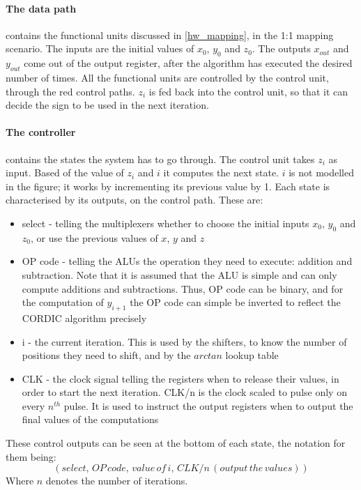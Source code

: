 \documentclass[12pt, a4paper,oneside]{article}
\begin{document}
\paragraph{The data path}
contains the functional units discussed in \ref{hw_mapping}, in the 1:1 mapping
scenario. The inputs are the initial values of $x_0$, $y_0$ and $z_0$. The outputs
$x_{out}$ and $y_{out}$
come out of the output register, after the algorithm has executed the desired
number of times. All the functional units are controlled by the control unit, 
through the red control paths. $z_i$ is fed back into the control unit, 
so that it can decide the sign to be used in the next iteration.

\paragraph{The controller}
contains the states the system has to go through. The control unit takes
$z_i$ as input. Based of the value of $z_i$ and $i$ it computes the next state.
$i$ is not modelled in the figure; it works by incrementing its previous
value by 1. Each state is characterised by its outputs, on the control
path. These are:

\begin{itemize}
	\item select - telling the multiplexers whether to choose the initial 
	inputs  $x_0$, $y_0$ and $z_0$, or use the previous values of 
	$x$, $y$ and $z$
	\item OP code - telling the ALUs the operation they need to execute:
	addition and subtraction. Note that it is assumed that the ALU is simple and can only
	compute additions and subtractions. Thus, OP code can be binary, and for the computation
	of $y_{i+1}$ the OP code can simple be inverted to reflect the CORDIC algorithm precisely
	\item i - the current iteration. This is used by the shifters, to 
	know the number of positions they need to shift, and by the $arctan$
	lookup table
	\item CLK - the clock signal telling the registers when to release their
	values, in order to start the next iteration. CLK/n is the clock scaled
	to pulse only on every $n^{th}$ pulse. It is used to instruct the output registers
	when to output the final values of the computations
\end{itemize}

These control outputs can be seen at the bottom of each state, the notation for them being:
\[(select,\, OP\, code,\, value\, of\, i,\, CLK/n\,(output\, the\, values))\]
Where $n$ denotes the number of iterations.
\end{document}
